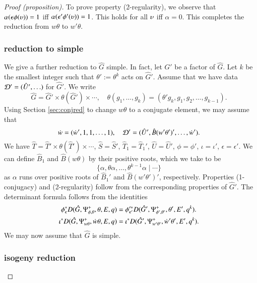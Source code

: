 \begin{proof}[Proof (proposition)]
To prove property (2-regularity), we observe that
$\alpha(\epsilon\phi(\upsilon))=1$ iff $\alpha(\epsilon'\phi'(\upsilon))=1$.
This holds for all $\upsilon$ iff $\alpha=0$.  This completes the reduction
from $w\theta$ to $w'\theta$.

\subsubsection{reduction to simple}

  We give a further reduction to $\hat G$ simple.  In fact, let
  $\hat G'$ be a factor of $\hat G$.  Let $k$ be the smallest integer
  such that $\theta':=\theta^k$ acts on $\hat G'$.  Assume that we
  have data $\mathcal D'=(\hat U',\ldots)$ for $\hat G'$.  We write
  \[
  \hat G = \hat G' \times \theta(\hat G') \times \cdots,
  \quad
  \theta(g_1,\ldots,g_k) = (\theta' g_k, g_1,g_2,\ldots,g_{k-1}).
  \]
  Using Section \ref{sec:conjred} to change $w\theta$ to a conjugate
  element, we may assume that
  \[
  \dot w = (\dot w',1,1,\ldots,1),\quad \mathcal D' = (\hat U',\hat B(w'\theta')',\ldots,\dot w').
  \]
  We have $\hat T = \hat T'\times \theta(\hat T')\times \cdots$, $\hat S = \hat S'$,
  $\hat T_1 = \hat T_1'$, $\hat U = \hat U'$, $\phi=\phi'$, $\iota=\iota'$,
  $\epsilon = \epsilon'$.  We can define $\hat B_1$ and
  $\hat B(w\theta)$ by their positive roots, which we take to be 
  \[
  \{\alpha,\theta\alpha,\ldots,\theta^{k-1}\alpha\mid \cdots\}
  \]
 as $\alpha$ runs over positive roots of $\hat B_1'$ and
  $\hat B( w'\theta')'$, respectively.  Properties (1-conjugacy) and (2-regularity)
  follow from the corresponding properties of $\hat G'$.  The
  determinant formula follows from the identities
  \begin{align*}
    \phi^*_\epsilon D(\hat G,\Psi_{\phi,\theta}^+,\theta,E,q) &=
    \phi'^*_{\epsilon'} D(\hat G',\Psi_{\phi',\theta'}^+,\theta',E',q^k).\\
    \iota^* D(\hat G,\Psi_{w\theta}^+,\dot w\theta,E,q) &=
    \iota^* D(\hat G',\Psi_{w'\theta'}^+,\dot w'\theta',E',q^k).
    \end{align*}
    We may now assume that $\hat G$ is simple.

\subsubsection{isogeny reduction}


\end{proof}
